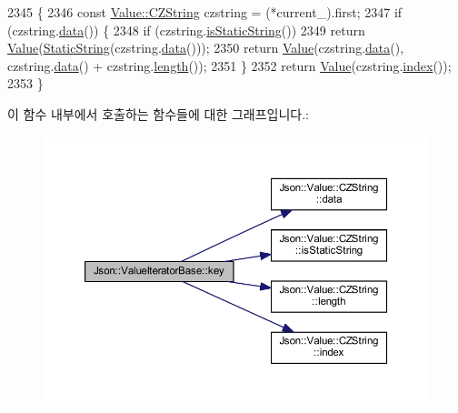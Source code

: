 \begin{DoxyCode}
2345                                    \{
2346   \textcolor{keyword}{const} \hyperlink{class_json_1_1_value_1_1_c_z_string}{Value::CZString} czstring = (*current\_).first;
2347   \textcolor{keywordflow}{if} (czstring.\hyperlink{class_json_1_1_value_1_1_c_z_string_af6eee54f8dc43a1203d5af6ba0a5c9a2}{data}()) \{
2348     \textcolor{keywordflow}{if} (czstring.\hyperlink{class_json_1_1_value_1_1_c_z_string_a5991dfa2f6c2ba318373c7429fcd7a57}{isStaticString}())
2349       \textcolor{keywordflow}{return} \hyperlink{class_json_1_1_value}{Value}(\hyperlink{class_json_1_1_static_string}{StaticString}(czstring.\hyperlink{class_json_1_1_value_1_1_c_z_string_af6eee54f8dc43a1203d5af6ba0a5c9a2}{data}()));
2350     \textcolor{keywordflow}{return} \hyperlink{class_json_1_1_value}{Value}(czstring.\hyperlink{class_json_1_1_value_1_1_c_z_string_af6eee54f8dc43a1203d5af6ba0a5c9a2}{data}(), czstring.\hyperlink{class_json_1_1_value_1_1_c_z_string_af6eee54f8dc43a1203d5af6ba0a5c9a2}{data}() + czstring.\hyperlink{class_json_1_1_value_1_1_c_z_string_aa7ee665d162c1f33b3ec818e289d8a5e}{length}());
2351   \}
2352   \textcolor{keywordflow}{return} \hyperlink{class_json_1_1_value}{Value}(czstring.\hyperlink{class_json_1_1_value_1_1_c_z_string_a0f3ba09401525d4f01dafd577122ee32}{index}());
2353 \}
\end{DoxyCode}
이 함수 내부에서 호출하는 함수들에 대한 그래프입니다.\+:
\nopagebreak
\begin{figure}[H]
\begin{center}
\leavevmode
\includegraphics[width=350pt]{class_json_1_1_value_iterator_base_a3838ba39c43c518cf3ed4aa6ce78ccad_cgraph}
\end{center}
\end{figure}
\mbox{\label{class_json_1_1_value_iterator_base_a54765da6759fd3f1edcbfbaf308ec263}} 
